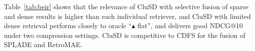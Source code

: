 Table~\ref{tab:beir} shows
that the relevance of CluSD with selective fusion of sparse and dense results is higher than each individual retriever,
and CluSD with limited dense retrieval   performs  closely to   oracle ``$\blacktriangle$ flat'',
and delivers good NDCG@10 under two compression settings. CluSD is competitive to CDFS for the fusion of SPLADE and RetroMAE.
  
